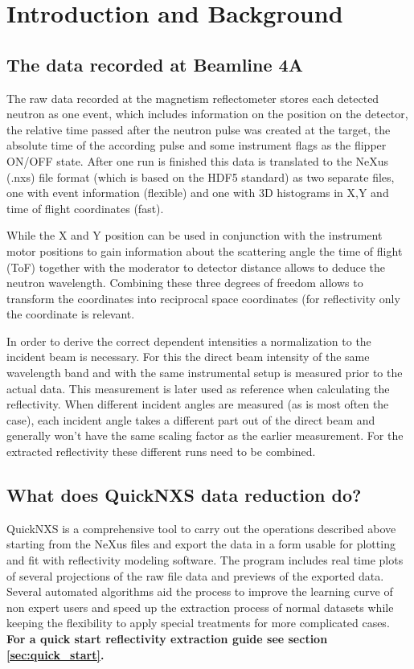 \chapter{Introduction and Background}
\label{chap:introduction}

  \section{The data recorded at Beamline 4A}
      The raw data recorded at the magnetism reflectometer stores each detected neutron as one event, which includes information on
      the position on the detector, the relative time passed after the neutron pulse was created at the target, the absolute time of the
      according pulse and some instrument flags as the flipper ON/OFF state.
      After one run is finished this data is translated to the NeXus (.nxs) file format (which is based on the HDF5 standard) as two separate files,
      one with event information (flexible) and one with 3D histograms in X,Y and time of flight coordinates (fast).
      
      While the X and Y position can be used in conjunction with the instrument motor positions to gain information about the scattering
      angle the time of flight (ToF) together with the moderator to detector distance allows to deduce the neutron wavelength.
      Combining these three degrees of freedom allows to transform the coordinates into reciprocal space coordinates (for reflectivity
      only the \Qz coordinate is relevant.
      
      In order to derive the correct \Qz dependent intensities a normalization to the incident beam is necessary. 
      For this the direct beam intensity of the same wavelength band and with the same instrumental setup is measured
      prior to the actual data. This measurement is later used as reference when calculating the reflectivity.
      When different incident angles are measured (as is most often the case), each incident angle takes a different part out of
      the direct beam and generally won't have the same scaling factor as the earlier measurement. For the extracted reflectivity
      these different runs need to be combined.
  
  \section{What does QuickNXS data reduction do?}
      QuickNXS is a comprehensive tool to carry out the operations described above starting from the NeXus files and export the
      data in a form usable for plotting and fit with reflectivity modeling software.
      The program includes real time plots of several projections of the raw file data and previews of the exported data.
      Several automated algorithms aid the process to improve the learning curve of non expert users and speed up
      the extraction process of normal datasets while keeping the flexibility to apply special treatments for more
      complicated cases.
      \textbf{For a quick start reflectivity extraction guide see section \ref{sec:quick_start}.}
